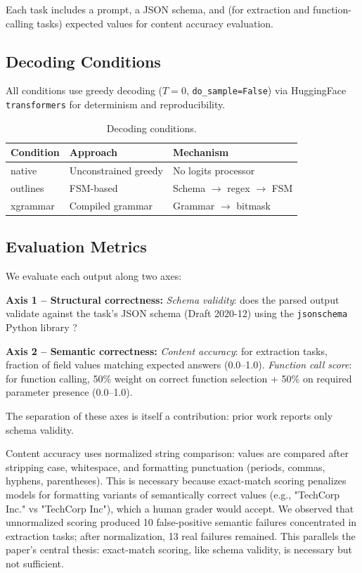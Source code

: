 \documentclass[11pt]{article}
\begin{document}
Each task includes a prompt, a JSON schema, and (for extraction and function-calling tasks) expected values for content accuracy evaluation.

\subsection{Decoding Conditions}
\label{sec:decoders}

All conditions use greedy decoding ($T=0$, \texttt{do\_sample=False}) via HuggingFace \texttt{transformers} \citep{transformers} for determinism and reproducibility.

\begin{table}[t]
\centering
\small
\setlength{\tabcolsep}{3pt}
\begin{tabular}{@{}lll@{}}
\toprule
\textbf{Condition} & \textbf{Approach} & \textbf{Mechanism} \\
\midrule
native & Unconstrained greedy & No logits processor \\
outlines & FSM-based & Schema $\to$ regex $\to$ FSM \\
xgrammar & Compiled grammar & Grammar $\to$ bitmask \\
\bottomrule
\end{tabular}
\caption{Decoding conditions.}
\label{tab:decoders}
\end{table}

\subsection{Evaluation Metrics}
\label{sec:metrics}

We evaluate each output along two axes:

\textbf{Axis 1 -- Structural correctness:}
\emph{Schema validity}: does the parsed output validate against the task's JSON schema (Draft 2020-12) \citep{jsonschema2020} using the \texttt{jsonschema} Python library \citep{jsonschema_py}?

\textbf{Axis 2 -- Semantic correctness:}
\emph{Content accuracy}: for extraction tasks, fraction of field values matching expected answers (0.0--1.0).
\emph{Function call score}: for function calling, 50\% weight on correct function selection + 50\% on required parameter presence (0.0--1.0).

The separation of these axes is itself a contribution: prior work reports only schema validity.

Content accuracy uses normalized string comparison: values are compared after stripping case, whitespace, and formatting punctuation (periods, commas, hyphens, parentheses). This is necessary because exact-match scoring penalizes models for formatting variants of semantically correct values (e.g., "TechCorp Inc." vs "TechCorp Inc"), which a human grader would accept. We observed that unnormalized scoring produced 10 false-positive semantic failures concentrated in extraction tasks; after normalization, 13 real failures remained. This parallels the paper's central thesis: exact-match scoring, like schema validity, is necessary but not sufficient.
\end{document}
